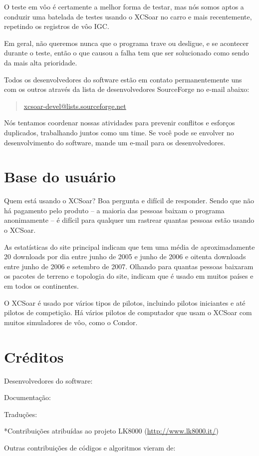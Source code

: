 O teste em vôo é certamente a melhor forma de testar, mas nós somos aptos a conduzir uma batelada de testes usando o XCSoar no carro e mais recentemente, repetindo os registros de vôo IGC.

Em geral, não queremos nunca que o programa trave ou desligue, e se acontecer durante o teste, então o que causou a falha tem que ser solucionado como sendo da mais alta prioridade.

Todos os desenvolvedores do software estão em contato permanentemente uns com os outros através da lista de desenvolvedores SourceForge no e-mail abaixo:

\begin{quote}
\url{xcsoar-devel@lists.sourceforge.net}
\end{quote}
Nós tentamos coordenar nossas atividades para prevenir conflitos e esforços duplicados, trabalhando juntos como um time.  Se você pode se envolver no desenvolvimento do software, mande um e-mail para os desenvolvedores.


\section{Base do usuário}

Quem está usando o XCSoar?  Boa pergunta e difícil de responder.  Sendo que não há pagamento pelo produto – a maioria das pessoas baixam o programa anonimamente – é difícil para qualquer um rastrear quantas pessoas estão usando o XCSoar.  

As estatísticas do site principal indicam que tem uma média de aproximadamente 20 downloads por dia entre junho de 2005 e junho de 2006 e oitenta downloads entre junho de 2006 e setembro de 2007.  Olhando para quantas pessoas baixaram os pacotes de terreno e topologia do site, indicam que é usado em muitos países e em todos os continentes.

O XCSoar é usado por vários tipos de pilotos, incluindo pilotos iniciantes e até pilotos de competição.  Há vários pilotos de computador que usam o XCSoar com muitos simuladores de vôo, como o Condor.



\section{Créditos}\label{sec:credits}

Desenvolvedores do software:
\begin{itemize}
  
\end{itemize}


Documentação:
\begin{itemize}
  
\end{itemize}


Traduções:
\begin{itemize}
  
\end{itemize}
*Contribuições atribuídas ao projeto LK8000 (\url{http://www.lk8000.it/})


Outras contribuições de códigos e algoritmos vieram de:
\begin{description}
  
\end{description}

